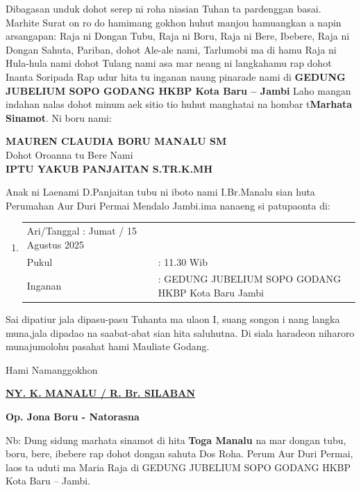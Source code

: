 \documentclass[24pt]{article}
\begin{document}
\begin{center}
{\begin{minipage}{\dimexpr\textwidth-2\fboxsep-2\fboxrule}
\hspace{30pt}
Dibagasan unduk dohot serep ni roha niasian Tuhan ta pardenggan basai. Marhite Surat on ro do hamimang gokhon huhut manjou hamuangkan a napin arsangapan: Raja ni Dongan Tubu, Raja ni Boru, Raja ni Bere, Ibebere, Raja ni Dongan Sahuta, Pariban, dohot Ale-ale nami, Tarlumobi ma di hamu Raja ni Hula-hula nami dohot Tulang nami asa mar neang ni langkahamu rap dohot Inanta Soripada Rap udur hita tu inganan naung pinarade nami di
\textbf{GEDUNG JUBELIUM SOPO GODANG HKBP Kota Baru -- Jambi} Laho mangan indahan nalas dohot minum aek sitio tio huhut manghatai na hombar t\textbf{Marhata Sinamot}. Ni boru nami:

\begin{center}
{\Large \textbf{\MakeUppercase{Mauren Claudia Boru Manalu SM}}}
\\[0.3cm]
\Large {Dohot Oroanna tu Bere Nami }
\\[0.3cm]
{\Large \textbf{\MakeUppercase{Iptu Yakub Panjaitan S.Tr.K.MH}}}
\end{center}

\vspace{0.1cm}
Anak ni Laenami D.Panjaitan tubu ni iboto nami I.Br.Manalu sian huta Perumahan Aur Duri Permai Mendalo Jambi.ima nanaeng si patupaonta di:

\begin{enumerate}[label={}]
\item\begin{tabular}{ l l }
Ari/Tanggal :  Jumat / 15 Agustus 2025 \\
Pukul & :  11.30 Wib \\
Inganan& :  GEDUNG JUBELIUM SOPO GODANG HKBP Kota Baru Jambi \\
\end{tabular}
\end{enumerate}

\vspace{0.1cm}
Sai dipatiur jala dipasu-pasu Tuhanta ma ulaon I, suang songon i nang langka muna,jala dipadao na saabat-abat sian hita saluhutna. Di siala haradeon niharoro munajumolohu pasahat hami Mauliate Godang.

\vspace{0.1cm}
\begin{center}
    

Hami Namanggokhon

\vspace{0.1cm}
\textbf{\uline{NY. K. MANALU / R. Br. SILABAN}}

\textbf{Op. Jona Boru - Natorasna}
\end{center}
\vspace{0.1cm}
Nb: Dung sidung marhata sinamot di hita \textbf{Toga Manalu} na mar dongan tubu, boru, bere, ibebere rap dohot dongan sahuta Dos Roha. Perum Aur Duri Permai, laos ta uduti ma Maria Raja di GEDUNG JUBELIUM SOPO GODANG HKBP Kota Baru -- Jambi.

\end{minipage}
}
\end{center}
\end{document}
